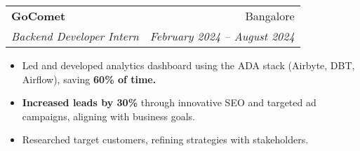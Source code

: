 \documentclass[letterpaper,11pt]{article}
\makeatletter
\newcommand{\resumeItem}[1]{
  \item\small{
    {#1 \vspace{-2pt}}
  }
}
\newcommand{\resumeSubheading}[4]{
  \vspace{-2pt}\item
    \begin{tabular*}{0.97\textwidth}[t]{l@{\extracolsep{\fill}}r}
      \textbf{#1} & #2 \\
      \textit{\small#3} & \textit{\small #4} \\
    \end{tabular*}\vspace{-7pt}
}
\newcommand{\resumeItemListStart}{\begin{itemize}}
\newcommand{\resumeItemListEnd}{\end{itemize}\vspace{-5pt}}
\makeatother
\begin{document}

    \resumeSubheading
    {GoComet}{Bangalore}
    {Backend Developer Intern}{February 2024 -- August 2024}
        \resumeItemListStart
            \resumeItem{Led and developed analytics dashboard using the ADA stack (Airbyte, DBT, Airflow), saving \textbf{60\% of time.}}
            \resumeItem{\textbf{Increased leads by 30\%} through innovative SEO and targeted ad campaigns, aligning with business goals.}
            \resumeItem{Researched target customers, refining strategies with stakeholders.}
        \resumeItemListEnd


        
    
       
\end{document}
